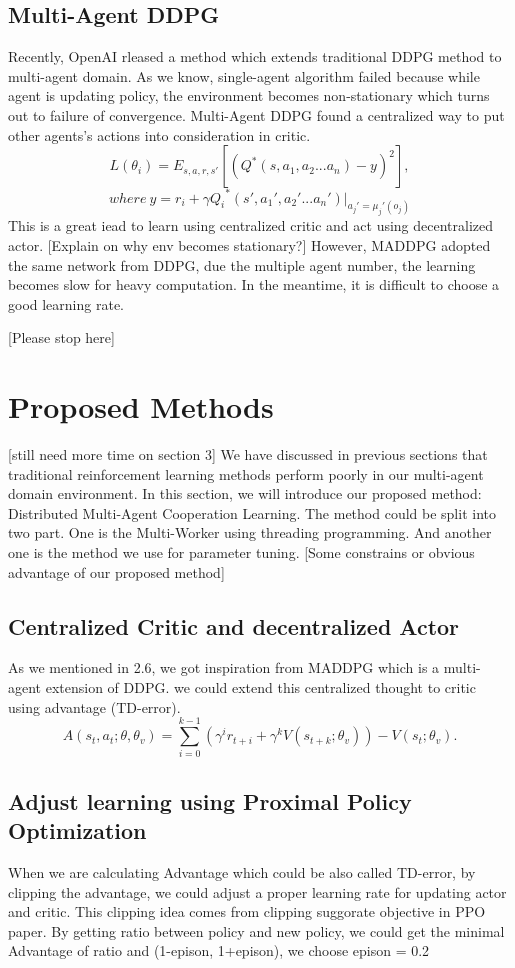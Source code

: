 \documentclass[11pt,twocolumn]{jarticle} %
\begin{document}
\subsection{Multi-Agent DDPG}
Recently, OpenAI rleased a method which extends traditional DDPG method to multi-agent domain. As we know, single-agent algorithm failed because while agent is updating policy, the environment becomes non-stationary which turns out to failure of convergence. Multi-Agent DDPG found a centralized way to put other agents's actions into consideration in critic.
\begin{equation}
L(\theta_i) = E_{s,a,r,s'}[(Q^*(s, a_1, a_2 ... a_n) - y)^2],  
\end{equation}
$$where\ y = r_i + \gamma{Q_i}^*(s', a_1', a_2' ... a_n') | _{a_j'=\mu_j'(o_j)}$$
This is a great iead to learn using centralized critic and act using decentralized actor. 
[Explain on why env becomes stationary?]
However, MADDPG adopted the same network from DDPG, due the multiple agent number, the learning becomes slow for heavy computation. In the meantime, it is difficult to choose a good learning rate.

[Please stop here]
\section{Proposed Methods}[still need more time on section 3]
We have discussed in previous sections that traditional reinforcement learning methods perform poorly in our multi-agent domain environment. In this section, we will introduce our proposed method: Distributed Multi-Agent Cooperation Learning. The method could be split into two part. One is the Multi-Worker using threading programming. And another one is the method we use for parameter tuning.
[Some constrains or obvious advantage of our proposed method]

\subsection{Centralized Critic and decentralized Actor}
As we mentioned in 2.6, we got inspiration from MADDPG which is a multi-agent extension of DDPG. we could extend this centralized thought to critic using advantage (TD-error).
\begin{equation}
A(s_t, a_t; \theta, \theta_v) = \sum_{i=0}^{k-1}(\gamma^i r_{t+i} + \gamma^k V(s_{t+k};\theta_v)) - V(s_t; \theta_v).
\end{equation}
\subsection{Adjust learning using Proximal Policy Optimization}
When we are calculating Advantage which could be also called TD-error, by clipping the advantage, we could adjust a proper learning rate for updating actor and critic. This clipping idea comes from clipping suggorate objective in PPO paper. By getting ratio between policy and new policy, we could get the minimal Advantage of ratio and (1-epison, 1+epison), we choose epison = 0.2
\end{document}
